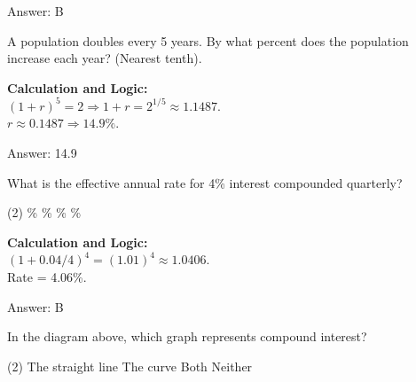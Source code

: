 \documentclass[11pt,paper=a4,answers]{exam}
\begin{document}
\begin{questions}
\begin{solution}
\vspace{30pt}

Answer: \colorbox{yellow!100}{B}
\end{solution}

\vspace{60pt}

\question
A population doubles every 5 years. By what percent does the population increase each year? (Nearest tenth).

\begin{solution}
\textbf{Calculation and Logic:} \\
$(1+r)^5 = 2 \Rightarrow 1+r = 2^{1/5} \approx 1.1487$. \\
$r \approx 0.1487 \Rightarrow 14.9\%$.

\vspace{30pt}

Answer: \colorbox{yellow!100}{14.9}
\end{solution}

\vspace{60pt}

\question
What is the effective annual rate for 4\% interest compounded quarterly?
\begin{tasks}(2)
    \%
    \%
    \%
    \%
\end{tasks}

\begin{solution}
\textbf{Calculation and Logic:} \\
$(1 + 0.04/4)^4 = (1.01)^4 \approx 1.0406$. \\
Rate = 4.06\%.

\vspace{30pt}

Answer: \colorbox{yellow!100}{B}
\end{solution}

\vspace{60pt}

\question

In the diagram above, which graph represents compound interest?
\begin{tasks}(2)
    \task The straight line
    \task The curve
    \task Both
    \task Neither
\end{tasks}


\end{questions}
\end{document}
